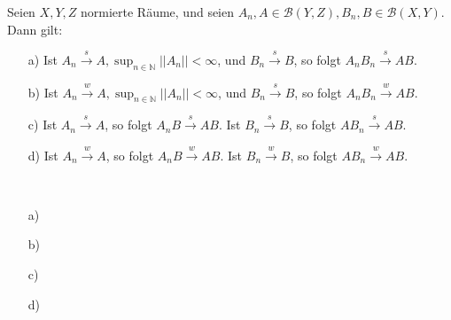 \begin{exercise}
Seien $X,Y,Z$ normierte Räume, und seien $A_n,A \in \mathcal{B}(Y,Z),B_n,B\in \mathcal{B}(X,Y)$.
Dann gilt:
\begin{itemize}
  \item [a)] Ist $A_n \stackrel{s}{\rightarrow} A, \sup_{n\in\mathbb{N}} ||A_n|| < \infty$,
  und $B_n \stackrel{s}{\rightarrow} B$, so folgt $A_nB_n \stackrel{s}{\rightarrow} AB$.
  \item [b)] Ist $A_n \stackrel{w}{\rightarrow} A, \sup_{n\in\mathbb{N}} ||A_n|| < \infty$,
  und $B_n \stackrel{s}{\rightarrow} B$, so folgt $A_nB_n \stackrel{w}{\rightarrow} AB$.
  \item [c)] Ist $A_n \stackrel{s}{\rightarrow} A$, so folgt $A_nB \stackrel{s}{\rightarrow} AB$.
  Ist $B_n \stackrel{s}{\rightarrow} B$, so folgt $AB_n \stackrel{s}{\rightarrow} AB$.
  \item [d)] Ist $A_n \stackrel{w}{\rightarrow} A$, so folgt $A_nB \stackrel{w}{\rightarrow} AB$.
  Ist $B_n \stackrel{w}{\rightarrow} B$, so folgt $AB_n \stackrel{w}{\rightarrow} AB$.
\end{itemize}
\end{exercise}

\begin{solution}
\leavevmode \\
\begin{itemize}
  \item [a)]
  \item [b)]
  \item [c)]
  \item [d)]
\end{itemize}


\end{solution}
